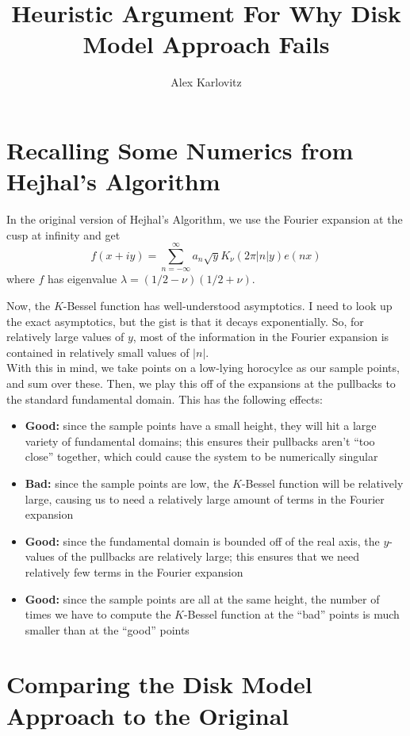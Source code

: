 \documentclass[]{article}
\title{Heuristic Argument For Why Disk Model Approach Fails}
\author{Alex Karlovitz}
\date{}
\begin{document}
	
	\maketitle
	
\section{Recalling Some Numerics from Hejhal's Algorithm}

In the original version of Hejhal's Algorithm, we use the Fourier expansion at the cusp at infinity and get
$$
f(x + iy) = \sum_{n=-\infty}^{\infty}a_n\sqrt{y}K_{\nu}(2\pi|n|y)e(nx)
$$
where $f$ has eigenvalue $\lambda = (1/2 - \nu)(1/2 + \nu)$.

Now, the $K$-Bessel function has well-understood asymptotics.
I need to look up the exact asymptotics, but the gist is that it decays exponentially.
So, for relatively large values of $y$, most of the information in the Fourier expansion is contained in relatively small values of $|n|$.
\\

With this in mind, we take points on a low-lying horocylce as our sample points, and sum over these.
Then, we play this off of the expansions at the pullbacks to the standard fundamental domain.
This has the following effects:
\begin{itemize}
	\item \textbf{Good:} since the sample points have a small height, they will hit a large variety of fundamental domains; this ensures their pullbacks aren't ``too close'' together, which could cause the system to be numerically singular
	\item \textbf{Bad:} since the sample points are low, the $K$-Bessel function will be relatively large, causing us to need a relatively large amount of terms in the Fourier expansion
	\item \textbf{Good:} since the fundamental domain is bounded off of the real axis, the $y$-values of the pullbacks are relatively large; this ensures that we need relatively few terms in the Fourier expansion
	\item \textbf{Good:} since the sample points are all at the same height, the number of times we have to compute the $K$-Bessel function at the ``bad'' points is much smaller than at the ``good'' points
\end{itemize}

\section{Comparing the Disk Model Approach to the Original}
\end{document}
